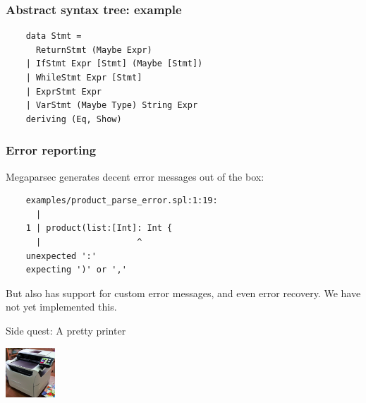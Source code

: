 \documentclass{beamer}
\begin{document}
\begin{frame}[fragile]
  \frametitle{Abstract syntax tree: example}

  \begin{verbatim}
    data Stmt =
      ReturnStmt (Maybe Expr)
    | IfStmt Expr [Stmt] (Maybe [Stmt])
    | WhileStmt Expr [Stmt]
    | ExprStmt Expr
    | VarStmt (Maybe Type) String Expr
    deriving (Eq, Show)
  \end{verbatim}
\end{frame}


\begin{frame}[fragile]
  \frametitle{Error reporting}

  Megaparsec generates decent error messages out of the box:

  \begin{verbatim}
    examples/product_parse_error.spl:1:19:
      |
    1 | product(list:[Int]: Int {
      |                   ^
    unexpected ':'
    expecting ')' or ','
  \end{verbatim}

  But also has support for custom error messages, and even error recovery. We have not yet implemented this.
\end{frame}

\begin{frame}
  \begin{center}Side quest: A pretty printer\end{center}

  \begin{center}
    \includegraphics[width=70px]{figures/printer.png}
  \end{center}
\end{frame}
\end{document}
